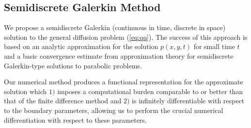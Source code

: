 \documentclass[10pt]{article}
\begin{document}
\subsection{Semidiscrete Galerkin Method}
We propose a semidiscrete Galerkin (continuous in time, discrete in
space) solution to the general diffusion problem (\ref{eq:qq}). The
success of this approach is based on an analytic approximation for the
solution $p(x,y,t)$ for small time $t$ and a basic convergence
estimate from approximation theory for semidiscrete Galerkin-type
solutions to parabolic problems. 

Our numerical method produces a functional representation for the
approximate solution which $1)$ imposes a computational burden
comparable to or better than that of the finite difference method and
$2)$ is infinitely differentiable with respect to the boundary
parameters, allowing us to perform the crucial numerical
differentiation with respect to these parameters.
\end{document}

